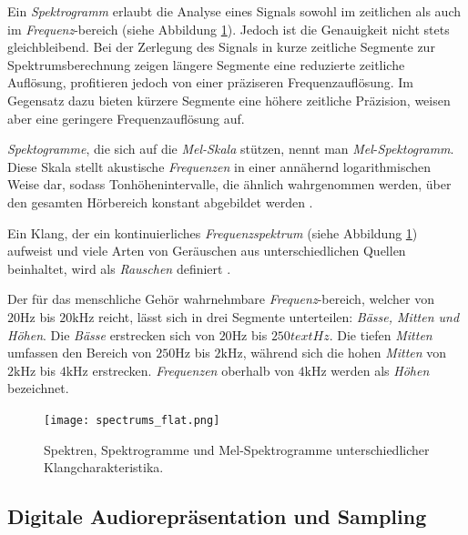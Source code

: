 \documentclass[
  a4paper,  %
  twoside,  %
  bibliography=totoc,
  headsepline,
  cleardoublepage=empty,
  parskip=half,
  draft=false
]{scrbook}
\begin{document}
Ein \emph{Spektrogramm} erlaubt die Analyse eines Signals sowohl im zeitlichen als auch im \emph{Frequenz}-bereich (siehe Abbildung \ref{fig:spectro}). Jedoch ist die Genauigkeit nicht stets gleichbleibend. Bei der Zerlegung des Signals in kurze zeitliche Segmente zur Spektrumsberechnung zeigen längere Segmente eine reduzierte zeitliche Auflösung, profitieren jedoch von einer präziseren Frequenzauflösung. Im Gegensatz dazu bieten kürzere Segmente eine höhere zeitliche Präzision, weisen aber eine geringere Frequenzauflösung auf. \cite{raffaseder_audiodesign_2010}

\emph{Spektogramme}, die sich auf die \emph{Mel-Skala} stützen, nennt man \emph{Mel}-\emph{Spektogramm}. Diese Skala stellt akustische \emph{Frequenzen} in einer annähernd logarithmischen Weise dar, sodass Tonhöhenintervalle, die ähnlich wahrgenommen werden, über den gesamten Hörbereich konstant abgebildet werden \cite{noauthor_librosamel_frequencies_nodate}.

Ein Klang, der ein kontinuierliches \emph{Frequenzspektrum} (siehe Abbildung \ref{fig:spectro}) aufweist und viele Arten von Geräuschen aus unterschiedlichen Quellen beinhaltet, wird als \emph{Rauschen} definiert \cite{tsuji_physics_2021}.

Der für das menschliche Gehör wahrnehmbare \emph{Frequenz}-bereich, welcher von $20\text{Hz}$ bis $20\text{kHz}$ reicht, lässt sich in drei Segmente unterteilen: \emph{Bässe, Mitten und Höhen}. Die \emph{Bässe} erstrecken sich von $20\text{Hz}$ bis $250text{Hz}$. Die tiefen \emph{Mitten} umfassen den Bereich von $250\text{Hz}$ bis $2\text{kHz}$, während sich die hohen \emph{Mitten} von $2\text{kHz}$ bis $4\text{kHz}$ erstrecken. \emph{Frequenzen} oberhalb von $4\text{kHz}$ werden als \emph{Höhen} bezeichnet. \cite{raffaseder_audiodesign_2010}

\begin{figure}
  \centering
  \texttt{[image: spectrums\_flat.png]}
  \caption[Spektren, Spektrogramme und Mel-Spektrogramme]{Spektren, Spektrogramme und Mel-Spektrogramme unterschiedlicher Klangcharakteristika.}
  \label{fig:spectro}
\end{figure}


\subsection{Digitale Audiorepräsentation und Sampling}
\end{document}
